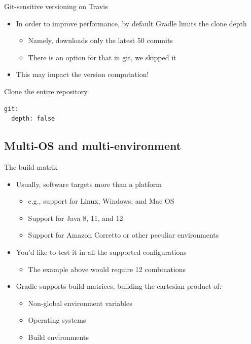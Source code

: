\documentclass[presentation]{beamer}
\begin{document}
\begin{frame}[fragile]{Git-sensitive versioning on Travis}
    \begin{itemize}
        \item In order to improve performance, by default Gradle limits the clone depth
        \begin{itemize}
            \item Namely, downloads only the latest 50 commits
            \item There is an option for that in git, we skipped it
        \end{itemize}
        \item This may impact the version computation!
    \end{itemize}
    \begin{block}{Clone the entire repository}
        \begin{verbatim}
git:
  depth: false
        \end{verbatim}
    \end{block}
\end{frame}

\subsection{Multi-OS and multi-environment}

\begin{frame}{The build matrix}
    \begin{itemize}
        \item Usually, software targets more than a platform
        \begin{itemize}
            \item e.g., support for Linux, Windows, and Mac OS
            \item Support for Java 8, 11, and 12
            \item Support for Amazon Corretto or other peculiar environments
        \end{itemize}
        \item You'd like to test it in all the supported configurations
        \begin{itemize}
            \item The example above would require 12 combinations
        \end{itemize}
        \item Gradle supports build matrices, building the cartesian product of:
        \begin{itemize}
            \item Non-global environment variables
            \item Operating systems
            \item Build environments
        \end{itemize}
    \end{itemize}
\end{frame}
\end{document}
